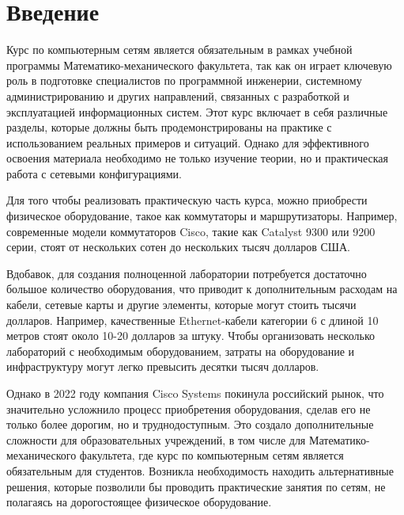 
\section*{Введение}
\thispagestyle{withCompileDate}

Курс по компьютерным сетям\cite{stepik} является обязательным в рамках учебной программы Математико-механического факультета, так как он играет ключевую роль в подготовке специалистов по программной инженерии, системному администрированию и других направлений, связанных с разработкой и эксплуатацией информационных систем.
Этот курс включает в себя различные разделы, которые должны быть продемонстрированы на практике с использованием реальных примеров и ситуаций.
Однако для эффективного освоения материала необходимо не только изучение теории, но и практическая работа с сетевыми конфигурациями.

Для того чтобы реализовать практическую часть курса, можно приобрести физическое оборудование, такое как коммутаторы и маршрутизаторы.
Например, современные модели коммутаторов Cisco\cite{cisco}, такие как Catalyst 9300 или 9200 серии, стоят от нескольких сотен до нескольких тысяч долларов США.

Вдобавок, для создания полноценной лаборатории потребуется достаточно большое количество оборудования, что приводит к дополнительным расходам на кабели, сетевые карты и другие элементы, которые могут стоить тысячи долларов.
Например, качественные Ethernet-кабели категории 6 с длиной 10 метров стоят около 10-20 долларов за штуку.
Чтобы организовать несколько лабораторий с необходимым оборудованием, затраты на оборудование и инфраструктуру могут легко превысить десятки тысяч долларов.

Однако в 2022 году компания Cisco Systems покинула российский рынок, что значительно усложнило процесс приобретения оборудования, сделав его не только более дорогим, но и труднодоступным. Это создало дополнительные сложности для образовательных учреждений, в том числе для Математико-механического факультета, где курс по компьютерным сетям является обязательным для студентов. Возникла необходимость находить альтернативные решения, которые позволили бы проводить практические занятия по сетям, не полагаясь на дорогостоящее физическое оборудование.

